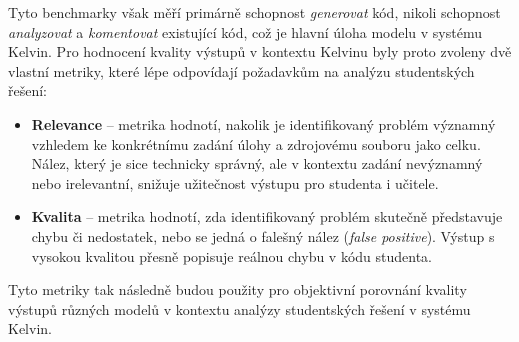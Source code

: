 Tyto benchmarky však měří primárně schopnost \textit{generovat} kód, nikoli schopnost \textit{analyzovat} a \textit{komentovat} existující kód, což je hlavní úloha modelu v systému Kelvin.
Pro hodnocení kvality výstupů v kontextu Kelvinu byly proto zvoleny dvě vlastní metriky, které lépe odpovídají požadavkům na analýzu studentských řešení:

\begin{itemize}
    \item \textbf{Relevance} -- metrika hodnotí, nakolik je identifikovaný problém významný vzhledem ke konkrétnímu zadání úlohy a zdrojovému souboru jako celku.
    Nález, který je sice technicky správný, ale v kontextu zadání nevýznamný nebo irelevantní, snižuje užitečnost výstupu pro studenta i učitele.

    \item \textbf{Kvalita} -- metrika hodnotí, zda identifikovaný problém skutečně představuje chybu či nedostatek, nebo se jedná o falešný nález (\textit{false positive}).
    Výstup s vysokou kvalitou přesně popisuje reálnou chybu v kódu studenta.
\end{itemize}

Tyto metriky tak následně budou použity pro objektivní porovnání kvality výstupů různých modelů v kontextu analýzy studentských řešení v systému Kelvin\@.

\endinput